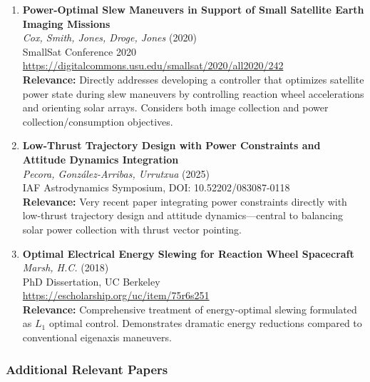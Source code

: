 \documentclass[11pt]{article}
\begin{document}
\begin{enumerate}[label=\textbf{\arabic*.}]
    \item \textbf{Power-Optimal Slew Maneuvers in Support of Small Satellite Earth Imaging Missions}\\
    \textit{Cox, Smith, Jones, Droge, Jones} (2020)\\
    SmallSat Conference 2020\\
    \url{https://digitalcommons.usu.edu/smallsat/2020/all2020/242}\\
    \textbf{Relevance:} Directly addresses developing a controller that optimizes satellite power state during slew maneuvers by controlling reaction wheel accelerations and orienting solar arrays. Considers both image collection and power collection/consumption objectives.

    \item \textbf{Low-Thrust Trajectory Design with Power Constraints and Attitude Dynamics Integration}\\
    \textit{Pecora, González-Arribas, Urrutxua} (2025)\\
    IAF Astrodynamics Symposium, DOI: 10.52202/083087-0118\\
    \textbf{Relevance:} Very recent paper integrating power constraints directly with low-thrust trajectory design and attitude dynamics---central to balancing solar power collection with thrust vector pointing.

    \item \textbf{Optimal Electrical Energy Slewing for Reaction Wheel Spacecraft}\\
    \textit{Marsh, H.C.} (2018)\\
    PhD Dissertation, UC Berkeley\\
    \url{https://escholarship.org/uc/item/75r6s251}\\
    \textbf{Relevance:} Comprehensive treatment of energy-optimal slewing formulated as $L_1$ optimal control. Demonstrates dramatic energy reductions compared to conventional eigenaxis maneuvers.
\end{enumerate}

\subsubsection{Additional Relevant Papers}
\end{document}

